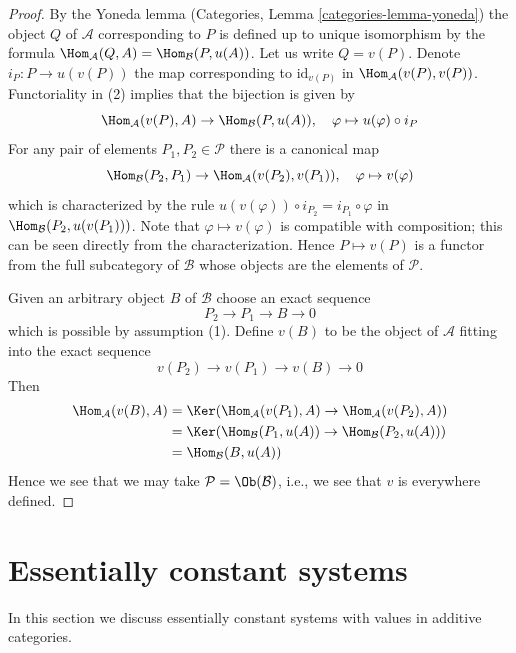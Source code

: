 \begin{proof}
By the Yoneda lemma (Categories, Lemma \ref{categories-lemma-yoneda})
the object $Q$ of $\mathcal{A}$ corresponding to $P$ is defined up to
unique isomorphism by the formula
$\Hom_\mathcal{A}(Q, A) = \Hom_\mathcal{B}(P, u(A))$. Let us write
$Q = v(P)$. Denote $i_P : P \to u(v(P))$ the map corresponding to
$\text{id}_{v(P)}$ in $\Hom_\mathcal{A}(v(P), v(P))$. Functoriality
in (2) implies that the bijection is given by
$$
\Hom_\mathcal{A}(v(P), A) \to \Hom_\mathcal{B}(P, u(A)),\quad
\varphi \mapsto u(\varphi) \circ i_P
$$
For any pair of elements $P_1, P_2 \in \mathcal{P}$ there is a canonical map
$$
\Hom_\mathcal{B}(P_2, P_1)
\to
\Hom_\mathcal{A}(v(P_2), v(P_1)),\quad
\varphi \mapsto v(\varphi)
$$
which is characterized by the rule
$u(v(\varphi)) \circ i_{P_2} = i_{P_1} \circ \varphi$ in
$\Hom_\mathcal{B}(P_2, u(v(P_1)))$.
Note that $\varphi \mapsto v(\varphi)$ is
compatible with composition; this can be seen directly
from the characterization. Hence $P \mapsto v(P)$ is a functor from
the full subcategory of $\mathcal{B}$ whose objects are the elements
of $\mathcal{P}$.

\medskip\noindent
Given an arbitrary object $B$ of $\mathcal{B}$ choose an exact sequence
$$
P_2 \to P_1 \to B \to 0
$$
which is possible by assumption (1). Define $v(B)$ to be the object of
$\mathcal{A}$ fitting into the exact sequence
$$
v(P_2) \to v(P_1) \to v(B) \to 0
$$
Then
\begin{align*}
\Hom_\mathcal{A}(v(B), A)
& =
\Ker(\Hom_\mathcal{A}(v(P_1), A) \to \Hom_\mathcal{A}(v(P_2), A)) \\
& =
\Ker(\Hom_\mathcal{B}(P_1, u(A)) \to \Hom_\mathcal{B}(P_2, u(A))) \\
& =
\Hom_\mathcal{B}(B, u(A))
\end{align*}
Hence we see that we may take $\mathcal{P} = \Ob(\mathcal{B})$, i.e., we
see that $v$ is everywhere defined.
\end{proof}

\section{Essentially constant systems}
\label{homology-section-essentially-constant}
In this section we discuss essentially constant systems with values in
additive categories.


